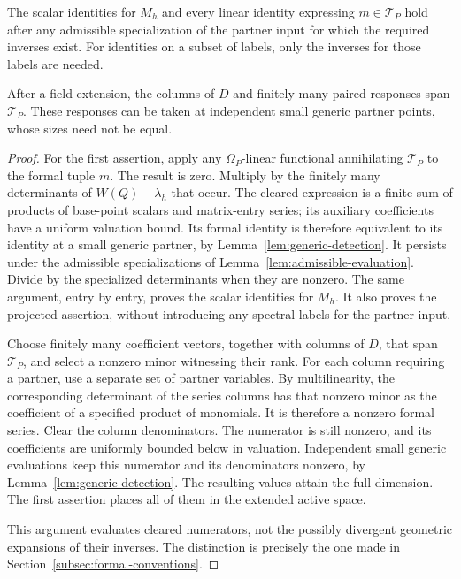 \begin{lemma}
\label{lem:active-specialization}
The scalar identities for $M_h$ and every linear identity expressing
$m\in\mathcal T_P$ hold after any admissible specialization of the
partner input for which the required inverses exist.  For identities
on a subset of labels, only the inverses for those labels are needed.

After a field extension, the columns of $D$ and finitely many paired
responses span $\mathcal T_P$.  These responses can be taken at
independent small generic partner points, whose sizes need not be
equal.
\end{lemma}

\begin{proof}
For the first assertion, apply any $\Omega_P$-linear functional
annihilating $\mathcal T_P$ to the formal tuple $m$.  The result is
zero.  Multiply by the finitely many determinants of
$W(Q)-\lambda_h$ that occur.  The cleared expression is a finite
sum of products of base-point scalars and matrix-entry series; its
auxiliary coefficients have a uniform valuation bound.  Its formal
identity is therefore equivalent to its identity at a small generic
partner, by Lemma~\ref{lem:generic-detection}.  It persists under the
admissible specializations of Lemma~\ref{lem:admissible-evaluation}.
Divide by the specialized determinants when they are nonzero.  The
same argument, entry by entry, proves the scalar identities for
$M_h$.  It also proves the projected assertion, without introducing
any spectral labels for the partner input.

Choose finitely many coefficient vectors, together with columns of
$D$, that span $\mathcal T_P$, and select a nonzero minor witnessing
their rank.  For each column requiring a partner, use a separate set
of partner variables.  By multilinearity, the corresponding
determinant of the series columns has that nonzero minor as the
coefficient of a specified product of monomials.  It is therefore a
nonzero formal series.  Clear the column denominators.  The numerator
is still nonzero, and its coefficients are uniformly bounded below
in valuation.  Independent small generic evaluations keep this
numerator and its denominators nonzero, by
Lemma~\ref{lem:generic-detection}.  The resulting values attain the
full dimension.  The first assertion places all of them in the
extended active space.

This argument evaluates cleared numerators, not the possibly
divergent geometric expansions of their inverses.  The distinction
is precisely the one made in Section~\ref{subsec:formal-conventions}.
\end{proof}

